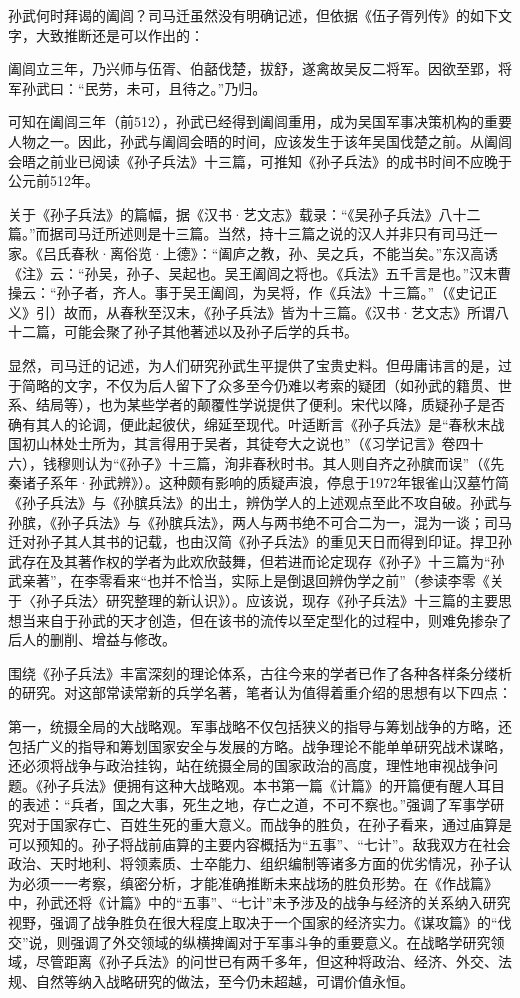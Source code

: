 \documentclass[12pt,UTF8]{ctexbook}
\begin{document}
孙武何时拜谒的阖闾？司马迁虽然没有明确记述，但依据《伍子胥列传》的如下文字，大致推断还是可以作出的：

阖闾立三年，乃兴师与伍胥、伯嚭伐楚，拔舒，遂禽故吴反二将军。因欲至郢，将军孙武曰：“民劳，未可，且待之。”乃归。

可知在阖闾三年（前512），孙武已经得到阖闾重用，成为吴国军事决策机构的重要人物之一。因此，孙武与阖闾会晤的时间，应该发生于该年吴国伐楚之前。从阖闾会晤之前业已阅读《孙子兵法》十三篇，可推知《孙子兵法》的成书时间不应晚于公元前512年。

关于《孙子兵法》的篇幅，据《汉书·艺文志》载录：“《吴孙子兵法》八十二篇。”而据司马迁所述则是十三篇。当然，持十三篇之说的汉人并非只有司马迁一家。《吕氏春秋·离俗览·上德》：“阖庐之教，孙、吴之兵，不能当矣。”东汉高诱《注》云：“孙吴，孙子、吴起也。吴王阖闾之将也。《兵法》五千言是也。”汉末曹操云：“孙子者，齐人。事于吴王阖闾，为吴将，作《兵法》十三篇。”（《史记正义》引）故而，从春秋至汉末，《孙子兵法》皆为十三篇。《汉书·艺文志》所谓八十二篇，可能会聚了孙子其他著述以及孙子后学的兵书。

显然，司马迁的记述，为人们研究孙武生平提供了宝贵史料。但毋庸讳言的是，过于简略的文字，不仅为后人留下了众多至今仍难以考索的疑团（如孙武的籍贯、世系、结局等），也为某些学者的颠覆性学说提供了便利。宋代以降，质疑孙子是否确有其人的论调，便此起彼伏，绵延至现代。叶适断言《孙子兵法》是“春秋末战国初山林处士所为，其言得用于吴者，其徒夸大之说也”（《习学记言》卷四十六），钱穆则认为“《孙子》十三篇，洵非春秋时书。其人则自齐之孙膑而误”（《先秦诸子系年·孙武辨》）。这种颇有影响的质疑声浪，停息于1972年银雀山汉墓竹简《孙子兵法》与《孙膑兵法》的出土，辨伪学人的上述观点至此不攻自破。孙武与孙膑，《孙子兵法》与《孙膑兵法》，两人与两书绝不可合二为一，混为一谈；司马迁对孙子其人其书的记载，也由汉简《孙子兵法》的重见天日而得到印证。捍卫孙武存在及其著作权的学者为此欢欣鼓舞，但若进而论定现存《孙子》十三篇为“孙武亲著”，在李零看来“也并不恰当，实际上是倒退回辨伪学之前”（参读李零《关于〈孙子兵法〉研究整理的新认识》）。应该说，现存《孙子兵法》十三篇的主要思想当来自于孙武的天才创造，但在该书的流传以至定型化的过程中，则难免掺杂了后人的删削、增益与修改。

围绕《孙子兵法》丰富深刻的理论体系，古往今来的学者已作了各种各样条分缕析的研究。对这部常读常新的兵学名著，笔者认为值得着重介绍的思想有以下四点：

第一，统摄全局的大战略观。军事战略不仅包括狭义的指导与筹划战争的方略，还包括广义的指导和筹划国家安全与发展的方略。战争理论不能单单研究战术谋略，还必须将战争与政治挂钩，站在统摄全局的国家政治的高度，理性地审视战争问题。《孙子兵法》便拥有这种大战略观。本书第一篇《计篇》的开篇便有醒人耳目的表述：“兵者，国之大事，死生之地，存亡之道，不可不察也。”强调了军事学研究对于国家存亡、百姓生死的重大意义。而战争的胜负，在孙子看来，通过庙算是可以预知的。孙子将战前庙算的主要内容概括为“五事”、“七计”。敌我双方在社会政治、天时地利、将领素质、士卒能力、组织编制等诸多方面的优劣情况，孙子认为必须一一考察，缜密分析，才能准确推断未来战场的胜负形势。在《作战篇》中，孙武还将《计篇》中的“五事”、“七计”未予涉及的战争与经济的关系纳入研究视野，强调了战争胜负在很大程度上取决于一个国家的经济实力。《谋攻篇》的“伐交”说，则强调了外交领域的纵横捭阖对于军事斗争的重要意义。在战略学研究领域，尽管距离《孙子兵法》的问世已有两千多年，但这种将政治、经济、外交、法规、自然等纳入战略研究的做法，至今仍未超越，可谓价值永恒。
\end{document}
